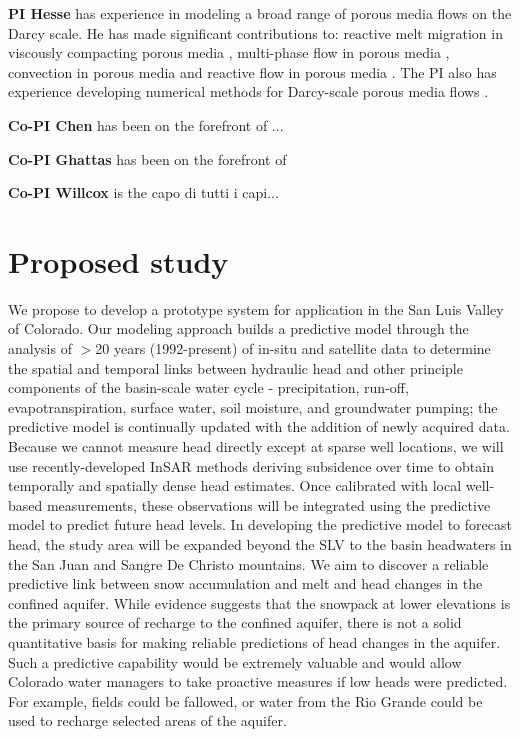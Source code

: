 \documentclass[11pt,final]{article}%
\begin{document}
\textbf{PI Hesse} has experience in modeling a broad range of porous media flows on the Darcy scale. He has made significant contributions to: reactive melt migration in viscously compacting porous media \cite{Hesse2003,Liang2010a,Liang2011b,Hesse2011,Schiemenz2011,Jordan2015,Arbogast2017,Jordan2018}, multi-phase flow in porous media \cite{Hesse2007,Hesse2008,Hesse2010,Golding2011,Sathaye2016b}, convection in porous media \cite{Riaz2006,Neufeld2010,MacMinn2012,Szulczewski2013a,Sathaye2014,Woods2015} and reactive flow in porous media \cite{Prigiobbe2012a,Prigiobbe2012b,Prigiobbe2013,Venkatraman2014,McNeece2016}. The PI also has experience developing numerical methods for Darcy-scale porous media flows \cite{Li2005,Hesse2008b,Schiemenz2011,Hesse2012,Hesse2014,Arbogast2017}.

\textbf{Co-PI Chen} has been on the forefront of ...

\textbf{Co-PI Ghattas} has been on the forefront of

\textbf{Co-PI Willcox} is the capo di tutti i capi...


\section{Proposed study}
We propose to develop a prototype system for application in the San Luis Valley of Colorado. Our modeling approach builds a predictive model through the analysis of $>$20 years (1992-present) of in-situ and satellite data to determine the spatial and temporal links between hydraulic head and other principle components of the basin-scale water cycle - precipitation, run-off, evapotranspiration, surface water, soil moisture, and groundwater pumping; the predictive model is continually updated with the addition of newly acquired data. Because we cannot measure head directly except at sparse well locations, we will use recently-developed InSAR methods deriving subsidence over time to obtain temporally and spatially dense head estimates.  Once calibrated with local well-based measurements, these observations will be integrated using the predictive model to predict future head levels. In developing the predictive model to forecast head, the study area will be expanded beyond the SLV to the basin headwaters in the San Juan and Sangre De Christo mountains. We aim to discover a reliable predictive link between snow accumulation and melt and head changes in the confined aquifer.  While evidence suggests that the snowpack at lower elevations is the primary source of recharge to the confined aquifer, there is not a solid quantitative basis for making reliable predictions of head changes in the aquifer.  Such a predictive capability would be extremely valuable and would allow Colorado water managers to take proactive measures if low heads were predicted.  For example, fields could be fallowed, or water from the Rio Grande could be used to recharge selected areas of the aquifer.
\end{document}

